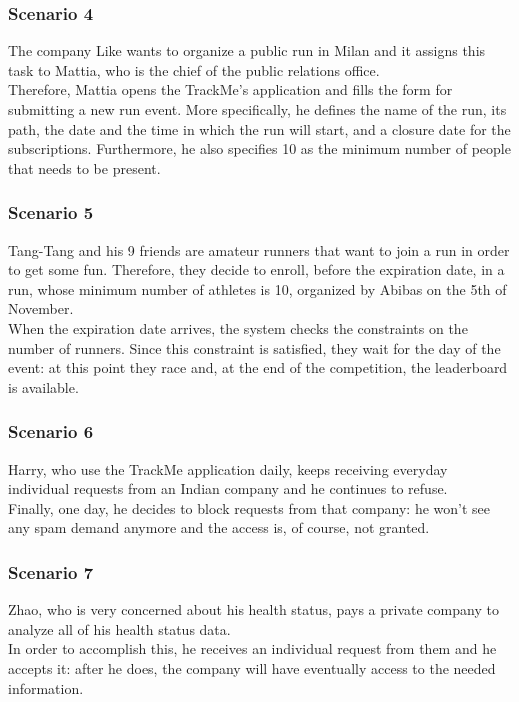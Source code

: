 \subsubsection{Scenario 4}
The company Like wants to organize a public run in Milan and it assigns this task to Mattia, who is the chief of the public relations office. \\
Therefore, Mattia opens the TrackMe's application and fills the form for submitting a new run event. 
More specifically, he defines the name of the run, its path, the date and the time in which the run will start, and a closure date for the subscriptions. 
Furthermore, he also specifies 10 as the minimum number of people that needs to be present.

\subsubsection{Scenario 5}
Tang-Tang and his 9 friends are amateur runners that want to join a run in order to get some fun. 
Therefore, they decide to enroll, before the expiration date, in a run, whose minimum number of athletes is 10, organized by Abibas on the 5th of November. \\
When the expiration date arrives, the system checks the constraints on the number of runners. 
Since this constraint is satisfied, they wait for the day of the event: at this point they race and, at the end of the competition, the leaderboard is available. 

\subsubsection{Scenario 6}
Harry, who use the TrackMe application daily, keeps receiving everyday individual requests from an Indian company and he continues to refuse.\\
Finally, one day, he decides to block requests from that company: he won't see any spam demand anymore and the access is, of course, not granted. 

\subsubsection{Scenario 7}
Zhao, who is very concerned about his health status, pays a private company to analyze all of his health status data. \\ 
In order to accomplish this, he receives an individual request from them and he accepts it: after he does, the company will have eventually access to the needed information.

